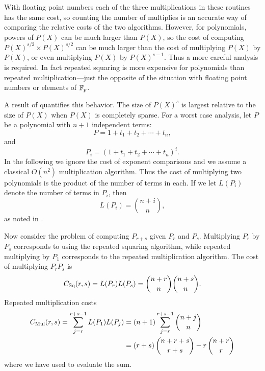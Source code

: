 \noindent
With floating point numbers each of the three multiplications in these
routines has the same cost, so counting the number of multiplies is an
accurate way of comparing the relative costs of the two algorithms.
However, for polynomials, powers of $P(X)$ can be much larger than
$P(X)$, so the cost of computing $P(X)^{s/2} \times P(X)^{s/2}$ can be
much larger than the cost of multiplying $P(X)$ by $P(X)$, or even
multiplying $P(X)$ by $P(X)^{s-1}$.  Thus a more careful analysis is
required.  In fact repeated squaring is more expensive for polynomials
than repeated multiplication---just the opposite of the situation with
floating point numbers or elements of $\mathbb{F}_p$.

A result of {\Gentleman} \cite{Gentleman:Exp} quantifies this
behavior.  The size of $P(X)^s$ is largest relative to the size of
$P(X)$ when $P(X)$ is completely sparse.  For a worst case analysis,
let $P$ be a polynomial with $n+1$ independent terms:
\[
P = 1 + t_1 + t_2 + \cdots + t_n,
\]
and
\[
P_i = (1 + t_1 + t_2 + \cdots + t_n)^i.
\]
In the following we ignore the cost of exponent comparisons and we assume a
classical $O(n^{2})$ multiplication algorithm.  Thus the cost of
multiplying two polynomials is the product of the number of terms in each.
If we let $L(P_i)$ denote the number of terms in $P_i$, then
\[
L(P_i) = {n + i \choose n},
\]
as noted in .

\newcommand{\Csq}{C_{\rm Sq}}
\newcommand{\Cmul}{C_{\rm Mul}}
Now consider the problem of computing $P_{r+s}$ given $P_r$ and $P_s$.
Multiplying $P_r$ by $P_s$ corresponds to using the repeated squaring
algorithm, while repeated multiplying by $P_1$ corresponds to the repeated
multiplication algorithm.  The cost of multiplying $P_r P_s$ is
\[
\Csq(r, s) = L(P_r) L(P_s) = {n + r \choose n} { n + s \choose n}.
\]
Repeated multiplication costs
\[
\begin{aligned}
  \Cmul(r, s) = 
  \sum_{j=r}^{r+s-1} L(P_1) L(P_j) &=
    (n+1) \sum_{j=r}^{r+s-1} {n + j \choose n}\\
     &= (r + s)\, {n + r + s \choose r+s} - r\, {n + r \choose r}
\end{aligned}
\]
where we have used  to evaluate the sum.


